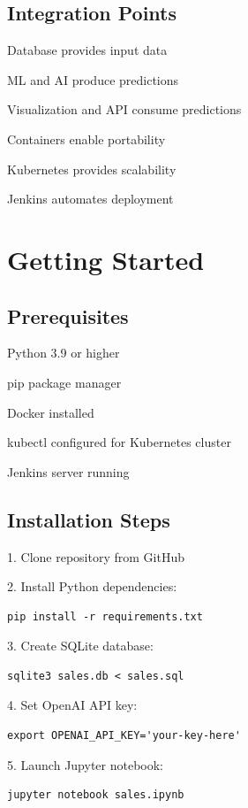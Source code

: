 \documentclass{article}
\begin{document}
\subsection{Integration Points}

Database provides input data

ML and AI produce predictions

Visualization and API consume predictions

Containers enable portability

Kubernetes provides scalability

Jenkins automates deployment

\section{Getting Started}

\subsection{Prerequisites}

Python 3.9 or higher

pip package manager

Docker installed

kubectl configured for Kubernetes cluster

Jenkins server running

\subsection{Installation Steps}

1. Clone repository from GitHub

2. Install Python dependencies:
\begin{verbatim}
pip install -r requirements.txt
\end{verbatim}

3. Create SQLite database:
\begin{verbatim}
sqlite3 sales.db < sales.sql
\end{verbatim}

4. Set OpenAI API key:
\begin{verbatim}
export OPENAI_API_KEY='your-key-here'
\end{verbatim}

5. Launch Jupyter notebook:
\begin{verbatim}
jupyter notebook sales.ipynb
\end{verbatim}
\end{document}
